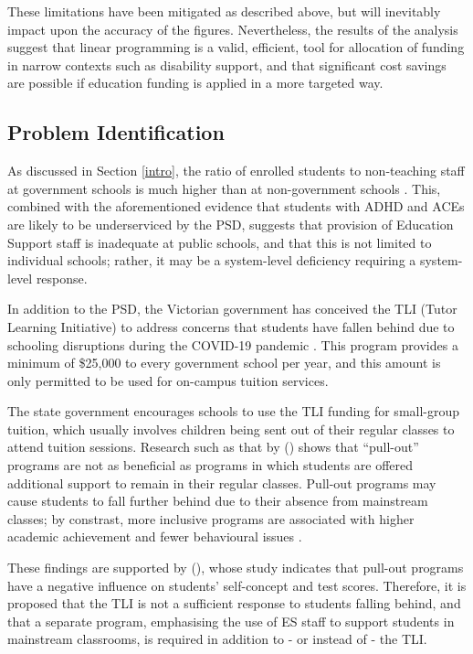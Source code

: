 \documentclass[11pt, a4paper]{article}
\begin{document}
    These limitations have been mitigated as described above, but will inevitably impact upon the accuracy of the figures. Nevertheless, the results of the analysis suggest that linear programming is a valid, efficient, tool for allocation of funding in narrow contexts such as disability support, and that significant cost savings are possible if education funding is applied in a more targeted way.  

    \subsection{Problem Identification} \label{problem_id}

    As discussed in Section \ref{intro}, the ratio of enrolled students to non-teaching staff at government schools is much higher than at non-government schools \parencite{acara_profiles}. This, combined with the aforementioned evidence that students with ADHD and ACEs are likely to be underserviced by the PSD, suggests that provision of Education Support staff is inadequate at public schools, and that this is not limited to individual schools; rather, it may be a system-level deficiency requiring a system-level response.

    In addition to the PSD, the Victorian government has conceived the TLI (Tutor Learning Initiative) to address concerns that students have fallen behind due to schooling disruptions during the COVID-19 pandemic \parencite{tli}. This program provides a minimum of \$25,000 to every government school per year, and this amount is only permitted to be used for on-campus tuition services. 

    The state government encourages schools to use the TLI funding for small-group tuition, which usually involves children being sent out of their regular classes to attend tuition sessions. Research such as that by  () shows that ``pull-out'' programs are not as beneficial as programs in which students are offered additional support to remain in their regular classes. Pull-out programs may cause students to fall further behind due to their absence from mainstream classes; by constrast, more inclusive programs are associated with higher academic achievement and fewer behavioural issues \parencite{pullout_rea}.
    
    These findings are supported by  (), whose study indicates that pull-out programs have a negative influence on students' self-concept and test scores. Therefore, it is proposed that the TLI is not a sufficient response to students falling behind, and that a separate program, emphasising the use of ES staff to support students in mainstream classrooms, is required in addition to - or instead of - the TLI. 
\end{document}
